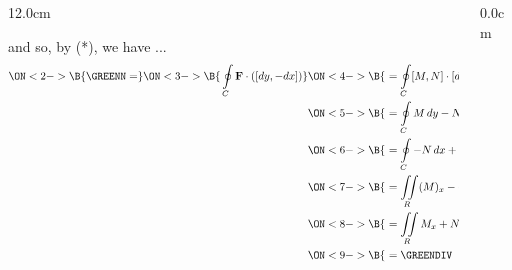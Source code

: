 \begin{frame}
\begin{columns}\begin{column}{12.0cm}

\scriptsize
and so, by (*), we have ...
\begin{align*}
	\ON<2->{\B{\GREENN = }}
	\ON<3->{\B{\, \oint \limits_{C} {\bf F} \cdot ([dy,-dx])}}
	&\ON<4->{\B{\,\,= \oint \limits_{C} [M,N] \cdot [dy,-dx]}}\\
	&\ON<5->{\B{\,\,= \oint \limits_{C} M\, dy - N \, dx}}\\
	&\ON<6->{\B{\,\,= \oint \limits_{C} - N \, dx + M\, dy }}\\
	&\ON<7->{\B{\,\,= \iint \limits_{R} (M)_x - (-N)_y\,dA }}\\
	&\ON<8->{\B{\,\,= \iint \limits_{R} M_x + N_y \,dA }}\\
	&\ON<9->{\B{\,\,= \GREENDIV \quad \checkmark}}\\
\end{align*}

\vspace{6.2cm}
	
\end{column}\begin{column}{0.0cm}\end{column}\end{columns}
\end{frame}

